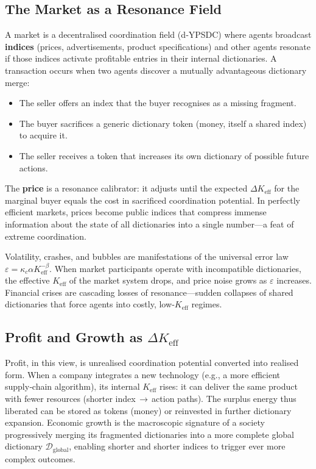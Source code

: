 \documentclass[12pt,a4paper]{article}
\newcommand{\Keff}{K_{\mathrm{eff}}}
\begin{document}
	\subsection{The Market as a Resonance Field}
	
	A market is a decentralised coordination field (d‑YPSDC) where agents broadcast \textbf{indices} (prices, advertisements, product specifications) and other agents resonate if those indices activate profitable entries in their internal dictionaries. A transaction occurs when two agents discover a mutually advantageous dictionary merge:
	\begin{itemize}[leftmargin=*]
		\item The seller offers an index that the buyer recognises as a missing fragment.
		\item The buyer sacrifices a generic dictionary token (money, itself a shared index) to acquire it.
		\item The seller receives a token that increases its own dictionary of possible future actions.
	\end{itemize}
	The \textbf{price} is a resonance calibrator: it adjusts until the expected $\Delta\Keff$ for the marginal buyer equals the cost in sacrificed coordination potential. In perfectly efficient markets, prices become public indices that compress immense information about the state of all dictionaries into a single number—a feat of extreme coordination.
	
	Volatility, crashes, and bubbles are manifestations of the universal error law $\varepsilon = \kappa_c \alpha \Keff^{-\beta}$. When market participants operate with incompatible dictionaries, the effective $\Keff$ of the market system drops, and price noise grows as $\varepsilon$ increases. Financial crises are cascading losses of resonance—sudden collapses of shared dictionaries that force agents into costly, low‑$\Keff$ regimes.
	
	\subsection{Profit and Growth as $\Delta\Keff$}
	
	Profit, in this view, is unrealised coordination potential converted into realised form. When a company integrates a new technology (e.g., a more efficient supply‑chain algorithm), its internal $\Keff$ rises: it can deliver the same product with fewer resources (shorter index $\rightarrow$ action paths). The surplus energy thus liberated can be stored as tokens (money) or reinvested in further dictionary expansion. Economic growth is the macroscopic signature of a society progressively merging its fragmented dictionaries into a more complete global dictionary $\mathcal{D}_{\text{global}}$, enabling shorter and shorter indices to trigger ever more complex outcomes.
	
\end{document}
